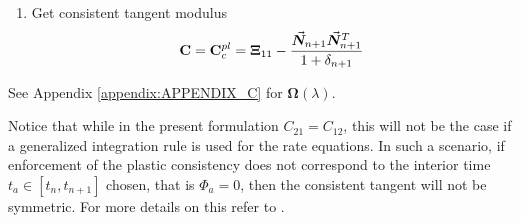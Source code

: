 {\begin{tcolorbox}
\begin{enumerate}
			\vspace{-1.7cm}
			\hspace{-0.15cm}\begin{minipage}[t]{0.3\linewidth}
				\begin{alignat*}{2}
					\blacksquare\hspace{0.3cm}	&\bvec{\zeta}_{n+1} &&=
					\bm{\Omega}(\lambda)\bvec{\zeta}_{n+1}^{TR}\\
					\blacksquare\hspace{0.3cm}	&\bvec{\epsilon}^{pl}_{n+1} &&= 
					\bvec{\epsilon}^{pl}_n + \lambda\bvec{n}_{n+1}\\
					\blacksquare\hspace{0.3cm}	&\bvec{\alpha}_{n+1} &&= 
					\bvec{\alpha}_n + \lambda 
					H_{kin}\bmat{V}^{-1}\bvec{n}_{n+1}\\
				\end{alignat*}
			\end{minipage}
			\begin{minipage}[t]{0.4\linewidth}
				\begin{alignat*}{2}
					\blacksquare\hspace{0.3cm} &\bvec{\sigma}_{n+1} &&= 
					\bvec{\zeta}_{n+1} + \bvec{\alpha}_{n+1}\\
					\blacksquare\hspace{0.3cm} &e^{pl}_{n+1} &&= e^{pl}_n + 
					\lambda \\
					\blacksquare\hspace{0.3cm}	&q_{n+1} &&= q_n + 
					\lambda\frac{\partial
						q_{n+1}}{\partial e_{n+1}^{pl}}
				\end{alignat*}
			\end{minipage}
			
			\vspace{-0.5cm}
			\item Get consistent tangent modulus
			\vspace{-0.5cm}
			$$\mathbf{C}=\mathbf{C}_c^{pl} = 
			\mathbf{\Xi}_{11}-\frac{\vec{\bm{N}}_{n+1}\vec{\bm{N}}_{n+1}^T}{1+\delta_{n+1}}$$
		\end{enumerate}
		See Appendix \ref{appendix:APPENDIX_C} for $\bm{\Omega}(\lambda)$.
		\step\label{Box:BOX1}
	\end{tcolorbox}
}
\clearpage

Notice that while in the present formulation $C_{21}=C_{12}$, this will not be
the case if a generalized integration rule is used for the rate equations. In
such a scenario, if enforcement of the plastic consistency does not correspond
to the interior time $t_a\in[t_n, t_{n+1}]$ chosen, that is $\Phi_a=0$, then 
the consistent tangent will not be symmetric. For more details on this refer to
\cite{Ortiz1985}.

